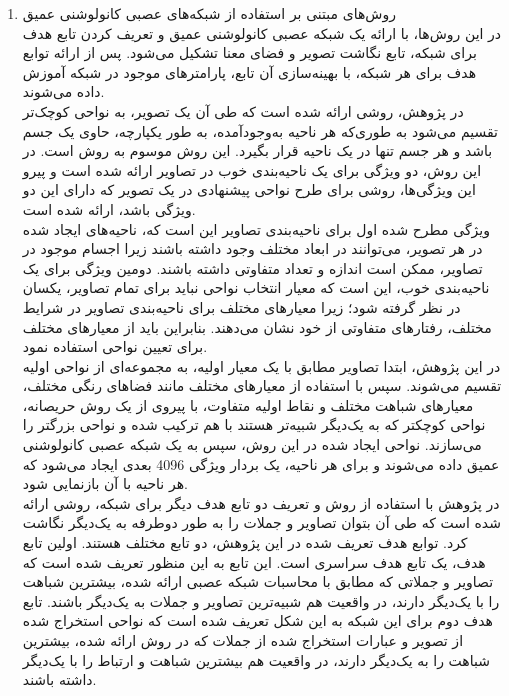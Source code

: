 \begin{enumerate}
\item
روش‌های مبتنی بر استفاده از شبکه‌های عصبی کانولوشنی عمیق\\
در این روش‌ها، با ارائه یک شبکه عصبی کانولوشنی عمیق و تعریف کردن تابع هدف برای شبکه، تابع نگاشت تصویر و فضای معنا تشکیل می‌شود. پس از ارائه توابع هدف برای هر شبکه، با بهینه‌سازی آن تابع، پارامترهای موجود در شبکه آموزش داده می‌شوند.
\\
در پژوهش\cite{Girshick_2014_CVPR}، روشی ارائه شده است که طی آن یک تصویر، به نواحی کوچک‌تر تقسیم می‌شود به طوری‌که هر ناحیه به‌وجودآمده، به طور یکپارچه، حاوی یک جسم باشد و هر جسم تنها در یک ناحیه قرار بگیرد. این روش موسوم به روش  است. در این روش، دو ویژگی برای یک ناحیه‌بندی خوب در تصاویر ارائه شده است و پیرو این ویژگی‌ها، روشی برای طرح نواحی پیشنهادی در یک تصویر که دارای این دو ویژگی باشد، ارائه شده است.
\\
ویژگی مطرح شده اول برای ناحیه‌بندی تصاویر این است که، ناحیه‌های ایجاد شده در هر تصویر، می‌توانند در ابعاد مختلف وجود داشته باشند زیرا اجسام موجود در تصاویر، ممکن است اندازه و تعداد متفاوتی داشته باشند. دومین ویژگی برای یک ناحیه‌بندی خوب، این است که معیار انتخاب نواحی نباید برای تمام تصاویر، یکسان در نظر گرفته شود؛ زیرا معیارهای مختلف برای ناحیه‌بندی تصاویر در شرایط مختلف، رفتارهای متفاوتی از خود نشان می‌دهند. بنابراین باید از معیارهای مختلف برای تعیین نواحی استفاده نمود.
\\
در این پژوهش، ابتدا تصاویر مطابق با یک معیار اولیه، به مجموعه‌ای از نواحی اولیه تقسیم می‌شوند. سپس با استفاده از معیارهای مختلف مانند فضاهای رنگی مختلف،‌ معیارهای شباهت مختلف و نقاط اولیه متفاوت، با پیروی از یک روش حریصانه، نواحی کوچکتر که به یک‌دیگر شبیه‌تر هستند با هم ترکیب شده و نواحی بزرگتر را می‌سازند. نواحی ایجاد شده در این روش، سپس به یک شبکه عصبی کانولوشنی عمیق داده می‌شوند و برای هر ناحیه، یک بردار ویژگی 4096 بعدی ایجاد می‌شود که هر ناحیه با آن بازنمایی شود.
\\
در پژوهش \cite{karpathy2014deep} با استفاده از روش  و تعریف دو تابع هدف دیگر برای شبکه، روشی ارائه شده است که طی آن بتوان تصاویر و جملات را به طور دوطرفه به یک‌دیگر نگاشت کرد. توابع هدف تعریف شده در این پژوهش، دو تابع مختلف هستند. اولین تابع هدف، یک تابع هدف سراسری است. این تابع به این منظور تعریف شده است که تصاویر و جملاتی که مطابق با محاسبات شبکه عصبی ارائه شده، بیشترین شباهت را با یک‌دیگر دارند، در واقعیت هم شبیه‌ترین تصاویر و جملات به یک‌دیگر باشند. تابع هدف دوم برای این شبکه به این شکل تعریف شده است که نواحی استخراج شده از تصویر و عبارات استخراج شده از جملات که در روش ارائه شده، بیشترین شباهت را به یک‌دیگر دارند،‌ در واقعیت هم بیشترین شباهت و ارتباط را با یک‌دیگر داشته باشند.

\end{enumerate}
